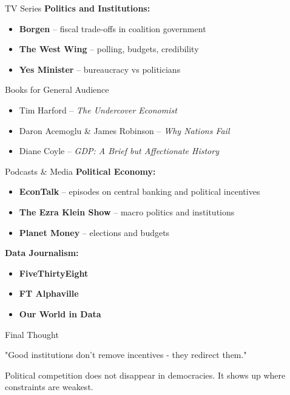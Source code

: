 \documentclass[10pt]{beamer}
\begin{document}
\begin{frame}{TV Series}
\textbf{Politics and Institutions:}
\begin{itemize}
\item \textbf{Borgen} – fiscal trade-offs in coalition government
\item \textbf{The West Wing} – polling, budgets, credibility
\item \textbf{Yes Minister} – bureaucracy vs politicians
\end{itemize}
\end{frame}


\begin{frame}{Books for General Audience}
\begin{itemize}
\item Tim Harford – \emph{The Undercover Economist}
\item Daron Acemoglu \& James Robinson – \emph{Why Nations Fail}
\item Diane Coyle – \emph{GDP: A Brief but Affectionate History}
\end{itemize}
\end{frame}


\begin{frame}[allowframebreaks]{Podcasts \& Media}
\textbf{Political Economy:}
\begin{itemize}
\item \textbf{EconTalk} – episodes on central banking and political incentives
\item \textbf{The Ezra Klein Show} – macro politics and institutions
\item \textbf{Planet Money} – elections and budgets
\end{itemize}

\framebreak
\textbf{Data Journalism:}
\begin{itemize}
\item \textbf{FiveThirtyEight}
\item \textbf{FT Alphaville}
\item \textbf{Our World in Data}
\end{itemize}
\end{frame}


\begin{frame}{Final Thought}
\begin{center}
\large "Good institutions don't remove incentives - they redirect them." 
\end{center}

\vspace{0.4cm}
\begin{center}
Political competition does not disappear in democracies.  
It shows up where constraints are weakest.
\end{center}
\end{frame}
\end{document}
